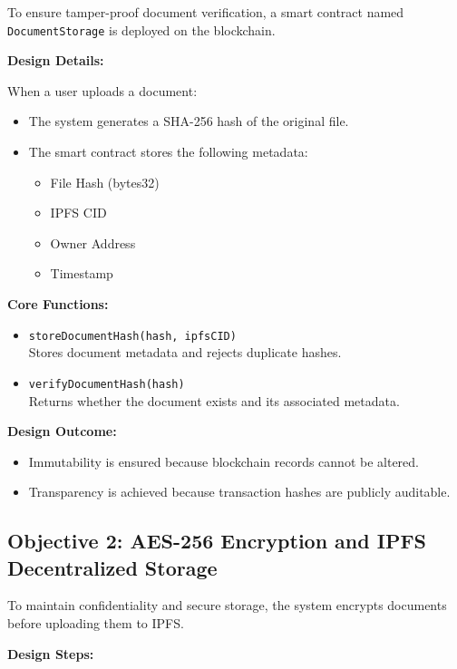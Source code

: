 \documentclass[12pt]{article}
\begin{document}
To ensure tamper-proof document verification, a smart contract named \texttt{DocumentStorage} is deployed on the blockchain.

\textbf{Design Details:}

When a user uploads a document:

\begin{itemize}
\item The system generates a SHA-256 hash of the original file.
\item The smart contract stores the following metadata:
\begin{itemize}
\item File Hash (bytes32)
\item IPFS CID
\item Owner Address
\item Timestamp
\end{itemize}
\end{itemize}

\textbf{Core Functions:}

\begin{itemize}
\item \texttt{storeDocumentHash(hash, ipfsCID)} \\ 
Stores document metadata and rejects duplicate hashes.

\item \texttt{verifyDocumentHash(hash)} \\ 
Returns whether the document exists and its associated metadata.
\end{itemize}

\textbf{Design Outcome:}

\begin{itemize}
\item Immutability is ensured because blockchain records cannot be altered.
\item Transparency is achieved because transaction hashes are publicly auditable.
\end{itemize}

\subsection{Objective 2: AES-256 Encryption and IPFS Decentralized Storage}

To maintain confidentiality and secure storage, the system encrypts documents before uploading them to IPFS.

\textbf{Design Steps:}
\end{document}

